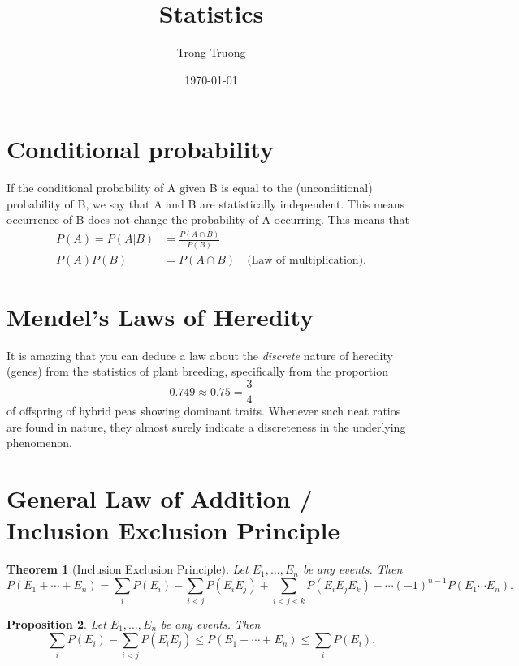 \documentclass[12pt]{article}
\title{Statistics}
\author{Trong Truong}
\date{\today}
\theoremstyle{plain}
\newtheorem{theorem}{Theorem}
\newtheorem{proposition}[theorem]{Proposition}
\theoremstyle{definition}
\theoremstyle{remark}
\begin{document}
\sloppy
\maketitle

\section{Conditional probability}

If the conditional probability of A given B is equal to the (unconditional)
probability of B, we say that A and B are statistically independent. This means
occurrence of B does not change the probability of A occurring. This means that
\begin{align*}
P(A) = P ( A | B ) &= \frac { P ( A \cap B ) } { P ( B ) } \\
P(A) P(B) &= P(A \cap B) \quad \text{(Law of multiplication).}
\end{align*}

\section{Mendel's Laws of Heredity}

It is amazing that you can deduce a law about the \emph{discrete} nature of
heredity (genes) from the statistics of plant breeding, specifically from the
proportion $$
0.749 \approx 0.75 = \frac{3}{4}
$$ of offspring of hybrid peas showing dominant traits. Whenever such neat
ratios are found in nature, they almost surely indicate a discreteness in the
underlying phenomenon.

\section{General Law of Addition / Inclusion Exclusion Principle}

\begin{theorem}[Inclusion Exclusion Principle]
Let $ E_1, \ldots, E_n $ be any events. Then $$
  P(E_1 + \cdots + E_n) = \sum_i P(E_i) - \sum_{i<j} P(E_i E_j) + \sum_{i<j<k} P(E_i E_j E_k) - \cdots (-1)^{n-1} P(E_1 \cdots E_n).
$$
\end{theorem}

\begin{proposition}
  Let $ E_1, \ldots, E_n $ be any events. Then $$
  \sum_i P(E_i) - \sum_{i<j} P(E_i E_j) \leq P(E_1 + \cdots + E_n) \leq \sum_i P(E_i).
  $$
\end{proposition}
\end{document}
